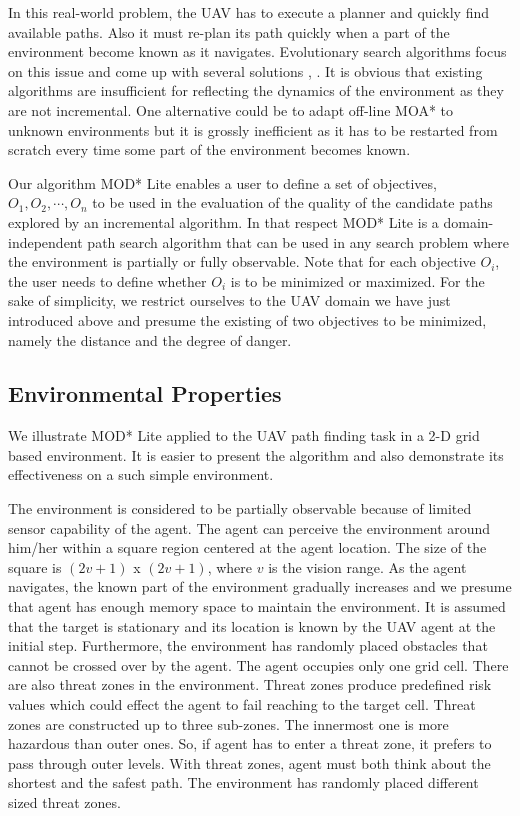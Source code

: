 \documentclass[10pt, a4paper, conference, compsocconf]{IEEEtran}
\begin{document}
In this real-world problem, the UAV has to execute a planner and quickly find available paths. Also it must re-plan its path quickly when a part of the environment become known as it navigates. Evolutionary search algorithms focus on this issue and come up with several solutions \cite{Peng_Xu_Zhang:2011}, \cite{Foo_Knutzon:2009}. It is obvious that existing algorithms are insufficient for reflecting the dynamics of the environment as they are not incremental. One alternative could be to adapt off-line MOA* to unknown environments but it is grossly inefficient as it has to be restarted from scratch every time some part of the environment becomes known. 

Our algorithm MOD* Lite enables a user to define a set of objectives, $O_1, O_2, \cdots, O_n$ to be used in the evaluation of the quality of the candidate paths explored by an incremental algorithm. In that respect MOD* Lite is a domain-independent path search algorithm that can be used in any search problem where the environment is partially or fully observable. Note that for each objective $O_i$, the user needs to define whether $O_i$ is to be minimized or maximized. For the sake of simplicity, we restrict ourselves to the UAV domain we have just introduced above and presume the existing of two objectives to be minimized, namely the distance and the degree of danger.

\subsection{Environmental Properties}
\label{envPropertiesSSection}
We illustrate MOD* Lite applied to the UAV path finding task in a 2-D grid based environment. It is easier to present the algorithm and also demonstrate its effectiveness on a such simple environment. 

The environment is considered to be partially observable because of limited sensor capability of the agent. The agent can perceive the environment around him/her within a square region centered at the agent location. The size of the square is $(2v + 1)$ x $(2v + 1)$, where $v$ is the vision range. As the agent navigates, the known part of the environment gradually increases and we presume that agent has enough memory space to maintain the environment. It is assumed that the target is stationary and its location is known by the UAV agent at the initial step. Furthermore, the environment has randomly placed obstacles that cannot be crossed over by the agent. The agent occupies only one grid cell. There are also threat zones in the environment. Threat zones produce predefined risk values which could effect the agent to fail reaching to the target cell. Threat zones are constructed up to three sub-zones. The innermost one is more hazardous than outer ones. So, if agent has to enter a threat zone, it prefers to pass through outer levels. With threat zones, agent must both think about the shortest and the safest path. The environment has randomly placed different sized threat zones.
\end{document}
